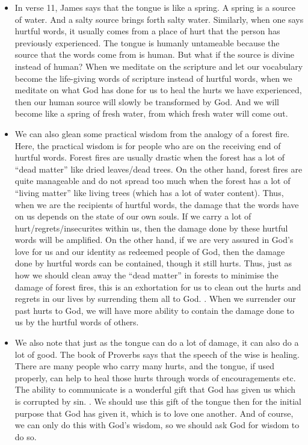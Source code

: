 \begin{itemize}
{  don't say words in anger''. Or our Christian friends can remind each other
  of that too. Or we can pray and ask for wisdom to do so.}
  \item{In verse 11, James says that the tongue is like a spring. A spring is
  a source of water. And a salty source brings forth salty water. Similarly,
  when one says hurtful words, it usually comes from a place of hurt that the
  person has previously experienced. The tongue is humanly untameable because
  the source that the words come from is human. But what if the source is
  divine instead of human? When we meditate on the scripture and let our
  vocabulary become the life-giving words of scripture instead of hurtful
  words, when we meditate on what God has done for us to heal the hurts we
  have experienced, then our human source will slowly be transformed by God.
  And we will become like a spring of fresh water, from which fresh water
  will come out. }
  \item{We can also glean some practical wisdom from the analogy of a forest
  fire. Here, the practical wisdom is for people who are on the receiving end
  of hurtful words. Forest fires are usually drastic when the forest has a
  lot of ``dead matter'' like dried leaves/dead trees. On the other hand,
  forest fires are quite manageable and do not spread too much when the
  forest has a lot of ``living matter'' like living trees (which has a lot of
  water content). Thus, when we are the recipients of hurtful words, the
  damage that the words have on us depends on the state of our own souls. If
  we carry a lot of hurt/regrets/insecurites within us, then the damage done
  by these hurtful words will be amplified. On the other hand, if we are very
  assured in God's love for us and our identity as redeemed people of God,
  then the damage done by hurtful words can be contained, though it still
  hurts. Thus, just as how we should clean away the ``dead matter'' in
  forests to minimise the damage of forest fires, this is an exhortation for
  us to clean out the hurts and regrets in our lives by surrending them all
  to God. . When we surrender our past hurts to God, we will have more
  ability to contain the damage done to us by the hurtful words of others. }
  \item{We also note that just as the tongue can do a lot of damage, it can
  also do a lot of good. The book of Proverbs says that the speech of the
  wise is healing. There are many people who carry many hurts, and the
  tongue, if used properly, can help to heal those hurts through words of
  encouragements etc. The ability to communicate is a wonderful gift that God
  has given us which is corrupted by sin. . We should
  use this gift of the tongue then for the initial purpose that God has given
  it, which is to love one another. And of course, we can only do this with God's wisdom, so we should ask God for wisdom to do so.}
\end{itemize}